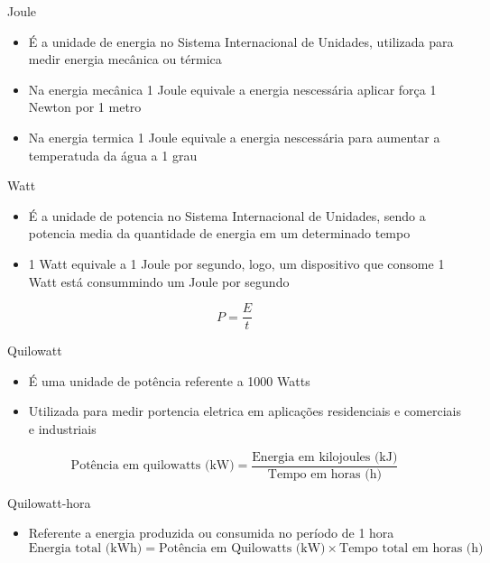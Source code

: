 \begin{frame}{Joule}
    \begin{itemize}
        \item É a unidade de energia no Sistema Internacional de Unidades, utilizada para medir energia mecânica ou térmica
        \item Na energia mecânica 1 Joule equivale a energia nescessária aplicar força 1 Newton por 1 metro
        \item Na energia termica 1 Joule equivale a energia nescessária para aumentar a temperatuda da água a 1 grau
    \end{itemize}

\end{frame}

\begin{frame}{Watt}
    \begin{itemize}
        \item É a unidade de potencia no Sistema Internacional de Unidades, sendo a potencia media da quantidade de energia em um determinado tempo
        \item 1 Watt equivale a 1 Joule por segundo, logo, um dispositivo que consome 1 Watt está consummindo um Joule por segundo
    \end{itemize}
    \begin{equation}
        P = \frac{E}{t}
    \end{equation}
\end{frame}

\begin{frame}{Quilowatt}
    \begin{itemize}
        \item É uma unidade de potência referente a 1000 Watts
        \item Utilizada para medir portencia eletrica em aplicações residenciais e comerciais e industriais
    \end{itemize}
    \begin{equation}
        \text{Potência em quilowatts (kW)} = \frac{\text{Energia em kilojoules (kJ)}}{\text{Tempo em horas (h)}}
        \end{equation}
\end{frame}

\begin{frame}{Quilowatt-hora}
    \begin{itemize}
        \item Referente a energia produzida ou consumida no período de 1 hora
        \begin{equation}
            \text{Energia total (kWh)} = \text{Potência em Quilowatts (kW)} \times \text{Tempo total em horas (h)}
            \end{equation}
    \end{itemize}
\end{frame}


